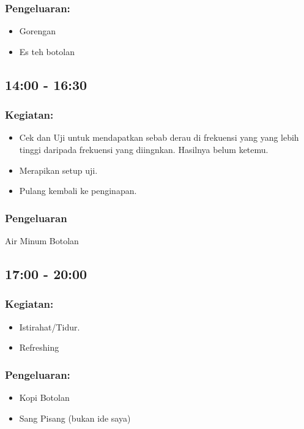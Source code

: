 \documentclass[12pt,]{article}
\begin{document}
	\subsubsection{Pengeluaran:}
	\begin{itemize}
		\item Gorengan
		\item Es teh botolan
	\end{itemize}

	\subsection{14:00 - 16:30}
	\subsubsection{Kegiatan:}
	\begin{itemize}
		\item Cek dan Uji untuk mendapatkan sebab derau di frekuensi yang yang lebih tinggi daripada frekuensi yang diingnkan.
		Hasilnya belum ketemu.
		\item Merapikan setup uji.
		\item Pulang kembali ke penginapan.
	\end{itemize}
	
	\subsubsection{Pengeluaran}
	Air Minum Botolan
	
	\newpage
	\subsection{17:00 - 20:00}
	\subsubsection{Kegiatan:}
	\begin{itemize}
		\item Istirahat/Tidur.
		\item Refreshing 
	\end{itemize}

	\subsubsection{Pengeluaran:}
	\begin{itemize}
		\item Kopi Botolan
		\item Sang Pisang (bukan ide saya)
	\end{itemize}
\end{document}
